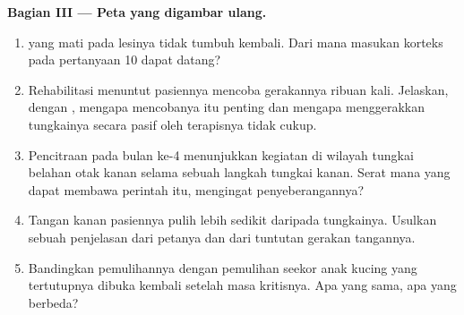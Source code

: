 \begin{problem}
\medskip
\noindent\textbf{Bagian III --- Peta yang digambar ulang.}
\begin{enumerate}[resume]
  \item {} yang mati pada lesinya tidak tumbuh kembali. Dari mana
        masukan korteks pada pertanyaan 10 dapat datang?
  \item Rehabilitasi menuntut pasiennya mencoba gerakannya ribuan kali.
        Jelaskan, dengan , mengapa mencobanya itu penting
        dan mengapa menggerakkan tungkainya secara pasif oleh terapisnya
        tidak cukup.
  \item Pencitraan pada bulan ke-4 menunjukkan kegiatan di wilayah
        tungkai belahan otak kanan selama sebuah langkah tungkai kanan.
        Serat mana yang dapat membawa perintah itu, mengingat
        penyeberangannya?
  \item Tangan kanan pasiennya pulih lebih sedikit daripada tungkainya.
        Usulkan sebuah penjelasan dari petanya dan dari tuntutan
        gerakan tangannya.
  \item Bandingkan pemulihannya dengan pemulihan seekor anak kucing
        yang  tertutupnya dibuka kembali setelah masa kritisnya.
        Apa yang sama, apa yang berbeda?
\end{enumerate}


\end{problem}
